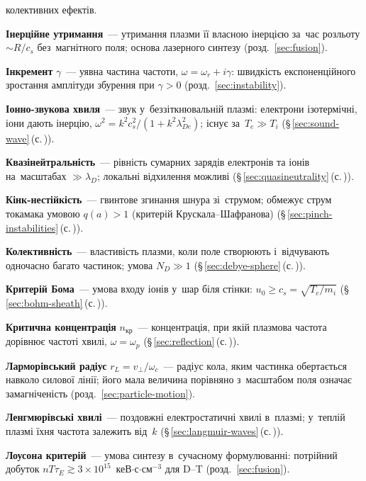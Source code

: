 	  колективних ефектів.
	\item \textbf{Інерційне утримання}~--- утримання плазми її власною інерцією за~час розльоту $\sim R/c_s$ без~магнітного поля; основа лазерного синтезу (розд.~\ref{sec:fusion}).
	\item \textbf{Інкремент} $\gamma$~--- уявна частина частоти, $\omega=\omega_r+i\gamma$: швидкість експоненційного зростання амплітуди збурення при $\gamma>0$ (розд.~\ref{sec:instability}).
	\item \textbf{Іонно-звукова хвиля}~--- звук у~беззіткнювальній плазмі: електрони ізотермічні, іони дають інерцію,
	  $\omega^2=k^2c_s^2/(1+k^2\lambda_{De}^2)$; існує за~$T_e\gg T_i$ (§\,\ref{sec:sound-wave}\,(с.\,\pageref{sec:sound-wave})).
	\item \textbf{Квазінейтральність}~--- рівність сумарних зарядів електронів та іонів на~масштабах $\gg\lambda_D$;
	  локальні відхилення можливі (§\,\ref{sec:quasineutrality}\,(с.\,\pageref{sec:quasineutrality})).
	\item \textbf{Кінк-нестійкість}~--- гвинтове згинання шнура зі~струмом; обмежує струм токамака умовою $q(a)>1$ (критерій Крускала--Шафранова) (§\,\ref{sec:pinch-instabilities}\,(с.\,\pageref{sec:pinch-instabilities})).
	\item \textbf{Колективність}~--- властивість плазми, коли поле створюють і~відчувають одночасно багато
	  частинок; умова $N_D\gg1$ (§\,\ref{sec:debye-sphere}\,(с.\,\pageref{sec:debye-sphere})).
	\item \textbf{Критерій Бома}~--- умова входу іонів у~шар біля стінки: $u_0\ge c_s=\sqrt{T_e/m_i}$
	  (§\,\ref{sec:bohm-sheath}\,(с.\,\pageref{sec:bohm-sheath})).
	\item \textbf{Критична концентрація} $n_{\text{кр}}$~--- концентрація, при якій плазмова частота дорівнює частоті
	  хвилі, $\omega=\omega_p$ (§\,\ref{sec:reflection}\,(с.\,\pageref{sec:reflection})).
	\item \textbf{Ларморівський радіус} $r_L=v_\perp/\omega_c$~--- радіус кола, яким частинка обертається навколо силової лінії; його мала величина порівняно з~масштабом поля означає замагніченість (розд.~\ref{sec:particle-motion}).
	\item \textbf{Ленгмюрівські хвилі}~--- поздовжні електростатичні хвилі в~плазмі; у~теплій плазмі їхня частота
	  залежить від~$k$ (§\,\ref{sec:langmuir-waves}\,(с.\,\pageref{sec:langmuir-waves})).
	\item \textbf{Лоусона критерій}~--- умова синтезу в~сучасному формулюванні: потрійний добуток $nT\tau_E\gtrsim3\times10^{15}$~кеВ$\cdot$с$\cdot$см$^{-3}$ для D--T (розд.~\ref{sec:fusion}).
